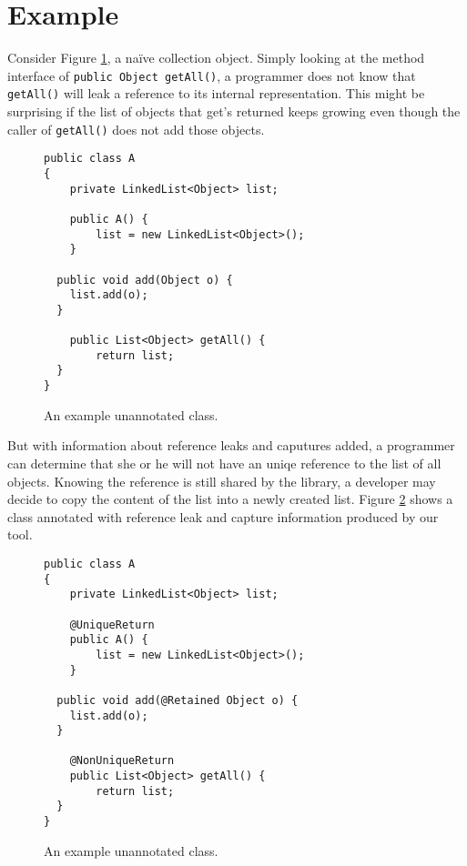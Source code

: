 \section{Example}
\label{sec:Example}

Consider Figure \ref{fig:preannotation}, a na\"ive collection object.
Simply looking at the method interface of 
\texttt{public Object getAll()}, a programmer does not know
that \texttt{getAll()} will leak a reference to its
internal representation. This might be surprising
if the list of objects that get's returned keeps growing
even though the caller of \texttt{getAll()} does not add those objects.

\begin{figure}[h]
\begin{lstlisting}
public class A
{
	private LinkedList<Object> list;
		
	public A() {
		list = new LinkedList<Object>();
	}
		
  public void add(Object o) {
   	list.add(o);
  }
    
	public List<Object> getAll() {
		return list;
  }
}
\end{lstlisting}
\label{fig:preannotation}
\caption{An example unannotated class.}
\end{figure}

But with information about reference leaks and caputures added, a programmer can 
determine that she or he will not have an uniqe reference
to the list of all objects.  Knowing the reference is still shared by the
library, a developer may decide to copy the content 
of the list into a newly created list.  Figure \ref{fig:postannotation}
shows a class annotated with reference leak and capture information produced by
our tool.

\begin{figure}[h]
\begin{lstlisting}
public class A
{
	private LinkedList<Object> list;
	
	@UniqueReturn
	public A() {
		list = new LinkedList<Object>();
	}
		
  public void add(@Retained Object o) {
   	list.add(o);
  }
  
	@NonUniqueReturn
	public List<Object> getAll() {
		return list;
  }
}
\end{lstlisting}
\label{fig:postannotation}
\caption{An example unannotated class.}
\end{figure}

